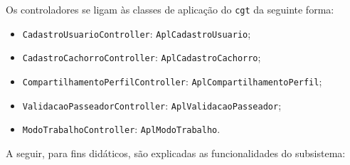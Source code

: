 Os controladores se ligam às classes de aplicação do \texttt{cgt} da seguinte forma:

\begin{itemize}
	\item \texttt{CadastroUsuarioController}: \texttt{AplCadastroUsuario};
	\item \texttt{CadastroCachorroController}: \texttt{AplCadastroCachorro};
	\item \texttt{CompartilhamentoPerfilController}: \texttt{AplCompartilhamentoPerfil};
	\item \texttt{ValidacaoPasseadorController}: \texttt{AplValidacaoPasseador};
	\item \texttt{ModoTrabalhoController}: \texttt{AplModoTrabalho}.
\end{itemize}

A seguir, para fins didáticos, são explicadas as funcionalidades do subsistema:

